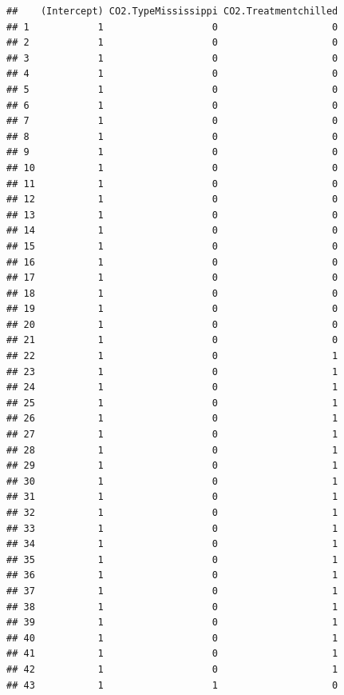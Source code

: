 \documentclass[
]{book}
\begin{document}
\begin{verbatim}
##    (Intercept) CO2.TypeMississippi CO2.Treatmentchilled
## 1            1                   0                    0
## 2            1                   0                    0
## 3            1                   0                    0
## 4            1                   0                    0
## 5            1                   0                    0
## 6            1                   0                    0
## 7            1                   0                    0
## 8            1                   0                    0
## 9            1                   0                    0
## 10           1                   0                    0
## 11           1                   0                    0
## 12           1                   0                    0
## 13           1                   0                    0
## 14           1                   0                    0
## 15           1                   0                    0
## 16           1                   0                    0
## 17           1                   0                    0
## 18           1                   0                    0
## 19           1                   0                    0
## 20           1                   0                    0
## 21           1                   0                    0
## 22           1                   0                    1
## 23           1                   0                    1
## 24           1                   0                    1
## 25           1                   0                    1
## 26           1                   0                    1
## 27           1                   0                    1
## 28           1                   0                    1
## 29           1                   0                    1
## 30           1                   0                    1
## 31           1                   0                    1
## 32           1                   0                    1
## 33           1                   0                    1
## 34           1                   0                    1
## 35           1                   0                    1
## 36           1                   0                    1
## 37           1                   0                    1
## 38           1                   0                    1
## 39           1                   0                    1
## 40           1                   0                    1
## 41           1                   0                    1
## 42           1                   0                    1
## 43           1                   1                    0

\end{verbatim}
\end{document}
